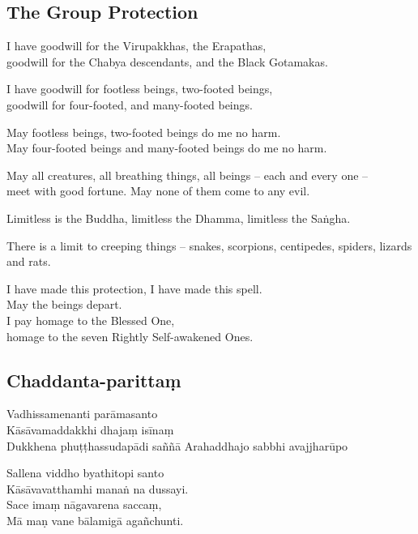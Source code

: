 
\subsection{The Group Protection}

I have goodwill for the Virupakkhas, the Erapathas,\\
goodwill for the Chabya descendants, and the Black Gotamakas.

I have goodwill for footless beings, two-footed beings,\\
goodwill for four-footed, and many-footed beings.

May footless beings, two-footed beings do me no harm.\\
May four-footed beings and many-footed beings do me no harm.

May all creatures, all breathing things, all beings -- each and every one --\\
meet with good fortune. May none of them come to any evil.

Limitless is the Buddha, limitless the Dhamma, limitless the Saṅgha.

There is a limit to creeping things -- snakes, scorpions, centipedes, spiders,
lizards and rats.

I have made this protection, I have made this spell.\\
May the beings depart.\\
I pay homage to the Blessed One,\\
homage to the seven Rightly Self-awakened Ones.

\subsection{Chaddanta-parittaṃ}
\label{vadhissamenanti}



\begin{paritta}

Vadhissamenanti parāmasanto\\
Kāsāvamaddakkhi dhajaṃ isīnaṃ\\
Dukkhena phuṭṭhassudapādi saññā
Arahaddhajo sabbhi avajjharūpo

Sallena viddho byathitopi santo\\
Kāsāvavatthamhi manaṅ na dussayi.\\
Sace imaṃ nāgavarena saccaṃ,\\
Mā maṇ vane bālamigā agañchunti.

\end{paritta}

